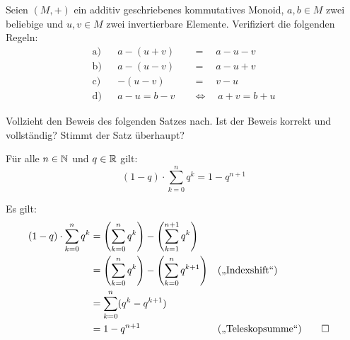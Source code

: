 \begin{aufg}
    Seien $(M,+)$ ein additiv geschriebenes kommutatives Monoid, $a,b\in M$ zwei beliebige und $u,v\in M$ zwei invertierbare Elemente. Verifiziert die folgenden Regeln:
    \begin{align*}
        \text{a)} && a-(u+v) \quad&=\quad a-u-v \\
        \text{b)} && a-(u-v) \quad&=\quad a-u+v \\
        \text{c)} && -(u-v) \quad&=\quad v-u \\
        \text{d)} && a-u=b-v \quad&\Leftrightarrow\quad a+v=b+u
    \end{align*}
\end{aufg}


\begin{comment}
\begin{aufg}[Kürzbarkeit]
    Sei $(M,*)$ ein Monoid. Ein Element $a\in M$ heißt \textbf{kürzbar}, wenn „Multiplikation mit $a$“ eine Äquivalenzumformung ist, d.h. wenn für alle $x,y\in M$ die beiden Äquivalenzen
    \begin{align*}
        a*x& =a*y \quad \leftrightarrow\quad x=y\\
        \text{und}\qquad x*a& =y*a \quad \leftrightarrow\quad x=y
    \end{align*}
    gelten.
    \begin{enumerate}
        \item Beweist, dass jedes invertierbare Element kürzbar ist.
        \item Ist ein kürzbares Element auch immer invertierbar?
    \end{enumerate}
\end{aufg}
\end{comment}


\begin{aufg} \label{aufg:geometrischereihe}
    Vollzieht den Beweis des folgenden Satzes nach. Ist der Beweis korrekt und vollständig? Stimmt der Satz überhaupt?
    \begin{satz}
        Für alle $n\in \mathbb N$ und $q\in \mathbb R$ gilt:
            \[ (1-q) \cdot \sum_{k=0}^n q^k = 1-q^{n+1} \]
    \end{satz}
    \begin{bew}
        Es gilt:
        \begin{align*}
            (1-q) \cdot \sum_{k=0}^n q^k & = \left( \sum_{k=0}^n q^k \right) - \left( \sum_{k=1}^{n+1} q^{k} \right) \\
            & = \left( \sum_{k=0}^n q^k \right) - \left( \sum_{k=0}^{n} q^{k+1} \right) && (\text{„Indexshift“}) \\
            & = \sum_{k=0}^n (q^k - q^{k+1}) \\
            & = 1 - q^{n+1} && (\text{„Teleskopsumme“}) \qed
        \end{align*}
    \end{bew}
\end{aufg}

